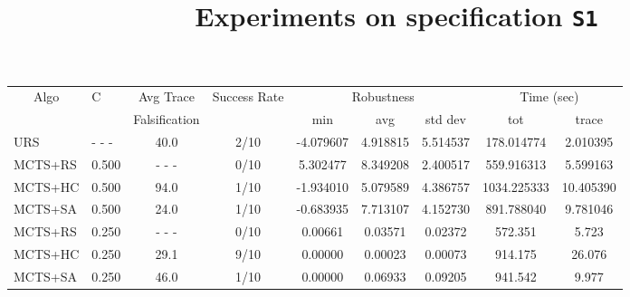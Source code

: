 \documentclass[11pt]{article}
\begin{document}
\begin{table}[ht]
\centering
\title{Experiments on specification \texttt{S1}}
\begin{tabular}{|l|l|c|c|c|c|c|c|c|}
\hline
\multicolumn{1}{|c|}{\multirow{2}{*}{Algo}} & \multirow{2}{*}{C} & Avg Trace               & \multirow{2}{*}{Success Rate} & \multicolumn{3}{c|}{Robustness} & \multicolumn{2}{c|}{Time (sec)} \\ \cline{5-9} 
\multicolumn{1}{|c|}{}                      &                    & Falsification           &                               & min       & avg      & std dev  & tot        & trace        \\ \hline
URS                                         & - - -              &  40.0                   & 2/10                          & -4.079607 & 4.918815 & 5.514537 & 178.014774 &  2.010395    \\ \hline
MCTS+RS                                     & 0.500              & - - -                   & 0/10                          &  5.302477 & 8.349208 & 2.400517 & 559.916313 &  5.599163    \\
MCTS+HC                                     & 0.500              &  94.0                   & 1/10                          & -1.934010 & 5.079589 & 4.386757 & 1034.225333& 10.405390    \\
MCTS+SA                                     & 0.500              &  24.0                   & 1/10                          & -0.683935 & 7.713107 & 4.152730 &  891.788040&  9.781046    \\ \hline
MCTS+RS                                     & 0.250              & - - -                   & 0/10                          & 0.00661   & 0.03571  & 0.02372  &  572.351   &  5.723       \\
MCTS+HC                                     & 0.250              &  29.1                   & 9/10                          & 0.00000   & 0.00023  & 0.00073  &  914.175   & 26.076       \\
MCTS+SA                                     & 0.250              &  46.0                   & 1/10                          & 0.00000   & 0.06933  & 0.09205  &  941.542   &  9.977       \\ \hline


\end{tabular}
\end{table}
\end{document}
